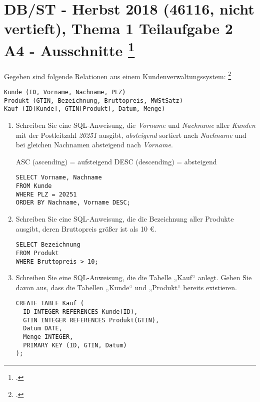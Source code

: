 \documentclass{lehramt-informatik-aufgabe}
\begin{document}
\section{DB/ST - Herbst 2018 (46116, nicht vertieft), Thema 1 Teilaufgabe 2 A4
- Ausschnitte
\footcite[Aufgabe 6: SQL Einstieg]{db:pu:1}
}

Gegeben sind folgende Relationen aus einem Kundenverwaltungssystem:
\footcite[DB/ST - Herbst 2018 (46116, nicht vertieft), Thema 1 Teilaufgabe 2 A4
- Ausschnitte]{examen:46116:2018:09}

\begin{verbatim}
Kunde (ID, Vorname, Nachname, PLZ)
Produkt (GTIN, Bezeichnung, Bruttopreis, MWStSatz)
Kauf (ID[Kunde], GTIN[Produkt], Datum, Menge)
\end{verbatim}

\begin{enumerate}


\item Schreiben Sie eine SQL-Anweisung, die \emph{Vorname} und
\emph{Nachname} aller \emph{Kunden} mit der Postleitzahl \emph{20251}
ausgibt, \emph{absteigend} sortiert nach \emph{Nachname} und bei
gleichen Nachnamen absteigend nach \emph{Vorname}.

ASC (ascending) = aufsteigend
DESC (descending) = absteigend

\begin{antwort}[muster]
\begin{verbatim}
SELECT Vorname, Nachname
FROM Kunde
WHERE PLZ = 20251
ORDER BY Nachname, Vorname DESC;
\end{verbatim}
\end{antwort}


\item Schreiben Sie eine SQL-Anweisung, die die Bezeichnung aller
Produkte ausgibt, deren Bruttopreis größer ist als 10 €.

\begin{antwort}[muster]
\begin{verbatim}
SELECT Bezeichnung
FROM Produkt
WHERE Bruttopreis > 10;
\end{verbatim}
\end{antwort}


\item Schreiben Sie eine SQL-Anweisung, die die Tabelle „Kauf“ anlegt.
Gehen Sie davon aus, dass die Tabellen „Kunde“ und „Produkt“ bereits
existieren.

\begin{antwort}[muster]
\begin{verbatim}
CREATE TABLE Kauf (
  ID INTEGER REFERENCES Kunde(ID),
  GTIN INTEGER REFERENCES Produkt(GTIN),
  Datum DATE,
  Menge INTEGER,
  PRIMARY KEY (ID, GTIN, Datum)
);
\end{verbatim}
\end{antwort}
\end{enumerate}
\end{document}
